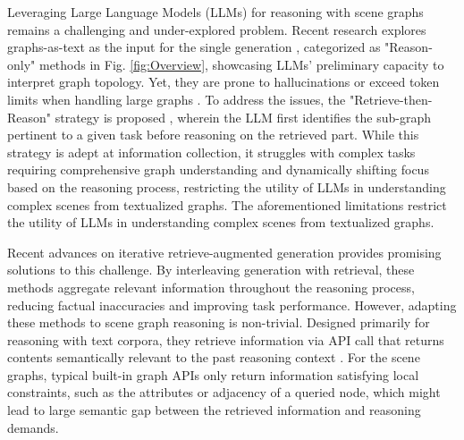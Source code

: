 Leveraging Large Language Models (LLMs) for reasoning with scene graphs remains a challenging and under-explored problem.
Recent research explores graphs-as-text as the input for the single generation \cite{talkLikeGraph, conceptgraphs}, categorized as "Reason-only" methods in Fig. \ref{fig:Overview}, showcasing LLMs' preliminary capacity to interpret graph topology. Yet, they are prone to hallucinations or exceed token limits when handling large graphs \citep{NLGraph}. 
 To address the issues, the "Retrieve-then-Reason" strategy is proposed \citep{reasonOnGraph, thinkOnGraph, sayplan}, 
 wherein the LLM first identifies the sub-graph pertinent to a given task before reasoning on the retrieved part.
While this strategy is adept at information collection, it struggles with complex tasks requiring comprehensive graph understanding and dynamically shifting focus based on the reasoning process, 
restricting the utility of LLMs in understanding complex scenes from textualized graphs.
The aforementioned limitations restrict the utility of LLMs in understanding complex scenes from textualized graphs.

Recent advances on iterative retrieve-augmented generation \citep{react, activeRAG, press2022measuring, iterRG} provides promising solutions to this challenge.
By interleaving generation with retrieval, these methods aggregate relevant information throughout the reasoning process, reducing factual inaccuracies and improving task performance.
However, adapting these methods to scene graph reasoning is non-trivial.
Designed primarily for reasoning with text corpora, they retrieve information via API call that returns contents semantically relevant to the past reasoning context \citep{IRCoT, react}.
For the scene graphs, typical built-in graph APIs only return information satisfying local constraints, such as the attributes or adjacency of a queried node, which might lead to large semantic gap between the retrieved information and reasoning demands.

